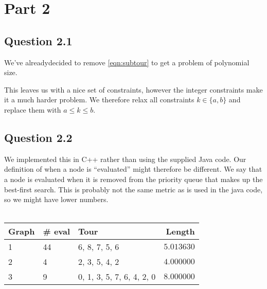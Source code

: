 \documentclass{sig-alternate}
\begin{document}
\section*{Part 2}
\subsection*{Question 2.1}

We've alreadydecided to remove \autoref{eqn:subtour} to get a problem of
polynomial size.

This leaves us with a nice set of constraints, however the integer constraints
make it a much harder problem. We therefore relax all constraints
$k\in \{a, b\}$ and replace them with $a\le k \le b$.

\subsection*{Question 2.2}
We implemented this in C++ rather than using the supplied Java code. Our
definition of when a node is ``evaluated'' might therefore be different. We say
that a node is evaluated when it is removed from the priority queue that makes
up the best-first search. This is probably not the same metric as is used in
the java code, so we might have lower numbers.
\\\\
\begin{tabular}{| l | l | l | r |}
\hline
\textbf{Graph} & \textbf{\# eval} & \textbf{Tour} & \textbf{Length} \\
\hline
1              & 44              & 6, 8, 7, 5, 6 & $5.013630$      \\
2              & 4               & 2, 3, 5, 4, 2 & $4.000000$      \\
3              & 9               & 0, 1, 3, 5, 7, 6, 4, 2, 0 & $8.000000$ \\
\hline
\end{tabular}


\end{document}
